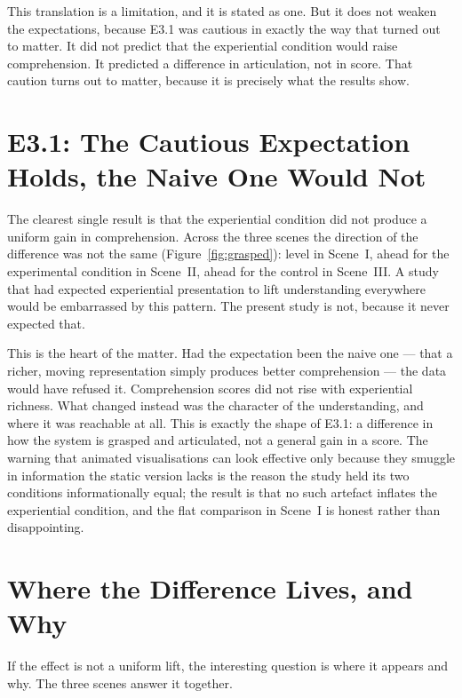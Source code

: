 This translation is a limitation, and it is stated as one. But it does not weaken the expectations, because E3.1 was cautious in exactly the way that turned out to matter. It did not predict that the experiential condition would raise comprehension. It predicted a difference in articulation, not in score. That caution turns out to matter, because it is precisely what the results show.

\section{E3.1: The Cautious Expectation Holds, the Naive One Would Not}
\label{sec:disc-e31}

The clearest single result is that the experiential condition did not produce a uniform gain in comprehension. Across the three scenes the direction of the difference was not the same (Figure~\ref{fig:grasped}): level in Scene~I, ahead for the experimental condition in Scene~II, ahead for the control in Scene~III. A study that had expected experiential presentation to lift understanding everywhere would be embarrassed by this pattern. The present study is not, because it never expected that.

This is the heart of the matter. Had the expectation been the naive one --- that a richer, moving representation simply produces better comprehension --- the data would have refused it. Comprehension scores did not rise with experiential richness. What changed instead was the character of the understanding, and where it was reachable at all. This is exactly the shape of E3.1: a difference in how the system is grasped and articulated, not a general gain in a score. The warning that animated visualisations can look effective only because they smuggle in information the static version lacks \parencite{tversky2002} is the reason the study held its two conditions informationally equal; the result is that no such artefact inflates the experiential condition, and the flat comparison in Scene~I is honest rather than disappointing.

\section{Where the Difference Lives, and Why}
\label{sec:disc-mechanism}

If the effect is not a uniform lift, the interesting question is where it appears and why. The three scenes answer it together.

